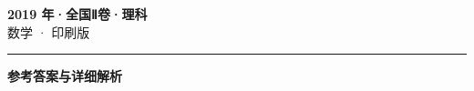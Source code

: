 \documentclass[zihao=5, a4paper]{ctexart}
\begin{document}
\begin{center}
  {\Large\bfseries 2019 年·全国Ⅱ卷·理科}\\[4pt]
  {\large 数学 · 印刷版}
\end{center}
\medskip
{}

\par\bigskip\hrule\bigskip
{}
\begin{center}{\large\bfseries 参考答案与详细解析}\end{center}
\smallskip

\end{document}
